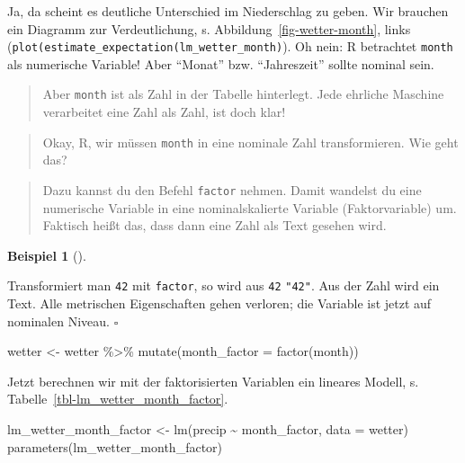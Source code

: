 \documentclass[
  letterpaper,
]{scrbook}
\newenvironment{Shaded}{\begin{snugshade}}{\end{snugshade}}
\newcommand{\AttributeTok}[1]{\textcolor[rgb]{0.40,0.45,0.13}{#1}}
\newcommand{\FunctionTok}[1]{\textcolor[rgb]{0.28,0.35,0.67}{#1}}
\newcommand{\NormalTok}[1]{\textcolor[rgb]{0.00,0.23,0.31}{#1}}
\newcommand{\OtherTok}[1]{\textcolor[rgb]{0.00,0.23,0.31}{#1}}
\newcommand{\SpecialCharTok}[1]{\textcolor[rgb]{0.37,0.37,0.37}{#1}}
\theoremstyle{definition}
\theoremstyle{definition}
\newtheorem{example}{Beispiel}[chapter]
\theoremstyle{definition}
\theoremstyle{remark}
\begin{document}
Ja, da scheint es deutliche Unterschied im Niederschlag zu geben. Wir
brauchen ein Diagramm zur Verdeutlichung, s.
Abbildung~\ref{fig-wetter-month}, links
(\texttt{plot(estimate\_expectation(lm\_wetter\_month)}). Oh nein: R
betrachtet \texttt{month} als numerische Variable! Aber \enquote{Monat}
bzw. \enquote{Jahreszeit} sollte nominal sein.

\begin{quote}
{} Aber \texttt{month} ist als Zahl in der Tabelle
hinterlegt. Jede ehrliche Maschine verarbeitet eine Zahl als Zahl, ist
doch klar!
\end{quote}

\begin{quote}
{} Okay, R, wir müssen \texttt{month} in eine nominale Zahl
transformieren. Wie geht das?
\end{quote}

\begin{quote}
{} Dazu kannst du den Befehl \texttt{factor} nehmen. Damit
wandelst du eine numerische Variable in eine nominalskalierte Variable
(Faktorvariable) um. Faktisch heißt das, dass dann eine Zahl als Text
gesehen wird.
\end{quote}

\begin{example}[]\protect\hypertarget{exm-factor}{}\label{exm-factor}

Transformiert man \texttt{42} mit \texttt{factor}, so wird aus
\texttt{42} \texttt{"42"}. Aus der Zahl wird ein Text. Alle metrischen
Eigenschaften gehen verloren; die Variable ist jetzt auf nominalen
Niveau. \(\square\)

\end{example}

\begin{Shaded}
\begin{Highlighting}[]
\NormalTok{wetter }\OtherTok{\textless{}{-}}
\NormalTok{  wetter }\SpecialCharTok{\%\textgreater{}\%} 
  \FunctionTok{mutate}\NormalTok{(}\AttributeTok{month\_factor =} \FunctionTok{factor}\NormalTok{(month))}
\end{Highlighting}
\end{Shaded}

Jetzt berechnen wir mit der faktorisierten Variablen ein lineares
Modell, s. Tabelle~\ref{tbl-lm_wetter_month_factor}.

\begin{Shaded}
\begin{Highlighting}[]
\NormalTok{lm\_wetter\_month\_factor }\OtherTok{\textless{}{-}} \FunctionTok{lm}\NormalTok{(precip }\SpecialCharTok{\textasciitilde{}}\NormalTok{ month\_factor, }\AttributeTok{data =}\NormalTok{ wetter)}
\FunctionTok{parameters}\NormalTok{(lm\_wetter\_month\_factor)}
\end{Highlighting}
\end{Shaded}
\end{document}

